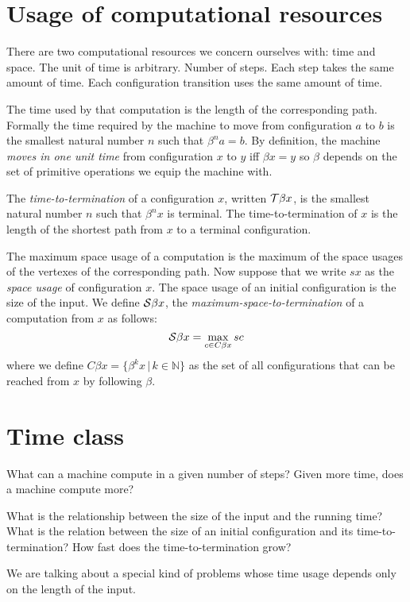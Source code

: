\section{Usage of computational resources}

There are two computational resources we concern ourselves with:
time and space.
The unit of time is arbitrary.
Number of steps. Each step takes the same amount of time.
Each configuration transition uses the same amount of time.

The time used by that computation is the length of the corresponding path.
Formally the time required by the machine
to move from configuration $a$ to $b$ is
the smallest natural number $n$ such that $\beta^n a = b$.
By definition, the machine \emph{moves in one unit time} from configuration $x$ to $y$ iff $\beta x = y$
so $\beta$ depends on the set of primitive operations we equip the machine with.

The \emph{time-to-termination} of a configuration $x$,
written $\mathcal{T} \beta x$,
is the smallest natural number $n$ such that $\beta^n x$ is terminal.
The time-to-termination of $x$ is the length of the shortest path from $x$ to a terminal configuration.

The maximum space usage of a computation is
the maximum of the space usages of the vertexes of the corresponding path.
Now suppose that we write $s x$ as the \emph{space usage} of configuration $x$.
The space usage of an initial configuration is the size of the input.
We define $\mathcal{S} \beta x$,
the \emph{maximum-space-to-termination} of a computation from $x$
as follows:
\begin{equation}
    \mathcal{S} \beta x = \max_{c \in C \beta x} s c
\end{equation}
where we define
$C \beta x = \{ \beta^k x \,|\, k \in \mathbb N \}$
as the set of all configurations
that can be reached from $x$ by following $\beta$.

\section{Time class}

What can a machine compute in a given number of steps?
Given more time, does a machine compute more?

What is the relationship between the size of the input and the running time?
What is the relation between the size of
an initial configuration and its time-to-termination?
How fast does the time-to-termination grow?

We are talking about a special kind of problems
whose time usage depends only on the length of the input.

